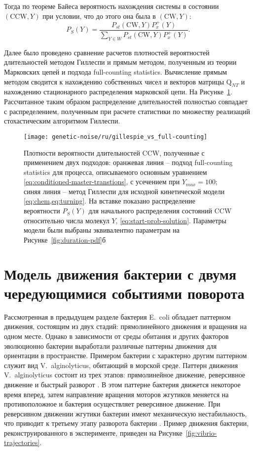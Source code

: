 Тогда по теореме Байеса вероятность нахождения системы в состоянии $(\mathrm{CCW}, Y)$ при условии, что до этого она была в $(\mathrm{CW}, Y)$:
\begin{equation}
    P_S(Y)=\frac{P_{st}(\mathrm{CW}, Y) P_x^+(Y)}{\sum_{Y\in W} P_{st}(\mathrm{CW}, Y) P_x^+(Y)}.
    \label{eq:start-prob-solution}
\end{equation}

Далее было проведено сравнение расчетов плотностей вероятностей длительностей методом Гиллеспи и прямым методом, полученным из теории Марковских цепей и подхода full-counting statistics. Вычисление прямым методом сводится к нахождению собственных чисел и векторов матрицы $\boldsymbol{\mathrm{Q}}_{NT}$ и нахождению стационарного распределения марковской цепи. На Рисунке~\cref{fig:gillespi-vs-direct}. Рассчитанное таким образом распределение длительностей полностью совпадает с распределением, полученным при расчете статистики по множеству реализаций стохастическим алгоритмом Гиллеспи.

\begin{figure}[ht]
    \centering
    \texttt{[image: genetic-noise/ru/gillespie\_vs\_full-counting]}
    \caption{
        Плотности вероятности длительностей CCW, полученные с применением двух подходов: оранжевая линия -- подход full-counting statistics для процесса, описываемого основным уравнением \cref{eq:conditioned-master-transtions}, с усечением при $Y_{max} = 100$; синяя линия -- метод Гиллеспи \cite{gillespie_stochastic_2007} для исходной кинетической модели \cref{eq:chem,eq:turning}. На вставке показано распределение вероятности $P_S(Y)$ для начального распределения состояний CCW относительно числа молекул $Y$, \cref{eq:start-prob-solution}. Параметры модели были выбраны эквивалентно параметрам на Рисунке~\cref{fig:duration-pdf}б
    }
    \label{fig:gillespi-vs-direct}
\end{figure}

\section{Модель движения бактерии с двумя чередующимися событиями поворота}\label{sec:ch2/sec2}

Рассмотренная в предыдущем разделе бактерия E.~coli обладает паттерном движения, состоящим из двух стадий: прямолинейного движения и вращения на одном месте. Однако в зависимости от среды обитания и других факторов эволюционно бактерии выработали различные паттерны движения для ориентации в пространстве. Примером бактерии с характерно другим паттерном служит вид V.~alginolyticus, обитающий в морской среде. Паттерн движения V.~alginolyticus состоит из трех этапов: прямолинейное движение, реверсивное движение и быстрый разворот \cite{xie_bacterial_2011}. В этом паттерне бактерия движется некоторое время вперед, затем направление вращения моторов жгутиков меняется на противоположное и бактерия осуществляет реверсивное движение. При реверсивном движении жгутики бактерии имеют механическую нестабильность, что приводит к третьему этапу разворота бактерии \cite{taute_high-throughput_2015}. Пример движения бактерии, реконструированного в эксперименте, приведен на Рисунке~\cref{fig:vibrio-trajectories}.

